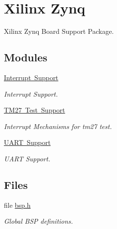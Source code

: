 \hypertarget{group__RTEMSBSPsARMZynq}{}\section{Xilinx Zynq}
\label{group__RTEMSBSPsARMZynq}


Xilinx Zynq Board Support Package.  


\subsection*{Modules}
\begin{DoxyCompactItemize}
\item 
\mbox{\hyperlink{group__zynq__interrupt}{Interrupt Support}}
\begin{DoxyCompactList}\small\item\em Interrupt Support. \end{DoxyCompactList}\item 
\mbox{\hyperlink{group__zynq__tm27}{T\+M27 Test Support}}
\begin{DoxyCompactList}\small\item\em Interrupt Mechanisms for tm27 test. \end{DoxyCompactList}\item 
\mbox{\hyperlink{group__zynq__uart}{U\+A\+R\+T Support}}
\begin{DoxyCompactList}\small\item\em U\+A\+RT Support. \end{DoxyCompactList}\end{DoxyCompactItemize}
\subsection*{Files}
\begin{DoxyCompactItemize}
\item 
file \mbox{\hyperlink{bsps_2arm_2xilinx-zynq_2include_2bsp_8h}{bsp.\+h}}
\begin{DoxyCompactList}\small\item\em Global B\+SP definitions. \end{DoxyCompactList}\end{DoxyCompactItemize}
